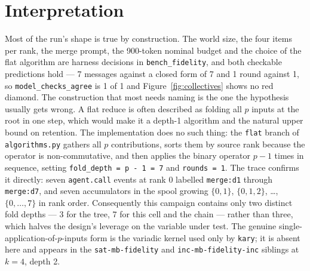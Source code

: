 \documentclass[11pt]{article}
\begin{document}
\section{Interpretation}

Most of the run's shape is true by construction. The world size, the four items per
rank, the merge prompt, the 900-token nominal budget and the choice of the flat
algorithm are harness decisions in \texttt{bench\_fidelity}, and both checkable
predictions hold --- 7 messages against a closed form of 7 and 1 round against 1, so
\texttt{model\_checks\_agree} is 1 of 1 and Figure~\ref{fig:collectives} shows no red
diamond. The construction that most needs naming is the one the hypothesis usually gets
wrong. A flat reduce is often described as folding all $p$ inputs at the root in one
step, which would make it a depth-1 algorithm and the natural upper bound on retention.
The implementation does no such thing: the \texttt{flat} branch of
\texttt{algorithms.py} gathers all $p$ contributions, sorts them by source rank because
the operator is non-commutative, and then applies the binary operator $p-1$ times in
sequence, setting \texttt{fold\_depth = p - 1 = 7} and \texttt{rounds = 1}. The trace
confirms it directly: seven \texttt{agent.call} events at rank 0 labelled
\texttt{merge:d1} through \texttt{merge:d7}, and seven accumulators in the spool growing
$\{0,1\}$, $\{0,1,2\}$, \dots, $\{0,\dots,7\}$ in rank order. Consequently this campaign
contains only two distinct fold depths --- 3 for the tree, 7 for this cell and the chain
--- rather than three, which halves the design's leverage on the variable under test. The
genuine single-application-of-$p$-inputs form is the variadic kernel used only by
\texttt{kary}; it is absent here and appears in the \texttt{sat-mb-fidelity} and
\texttt{inc-mb-fidelity-inc} siblings at $k = 4$, depth 2.
\end{document}

